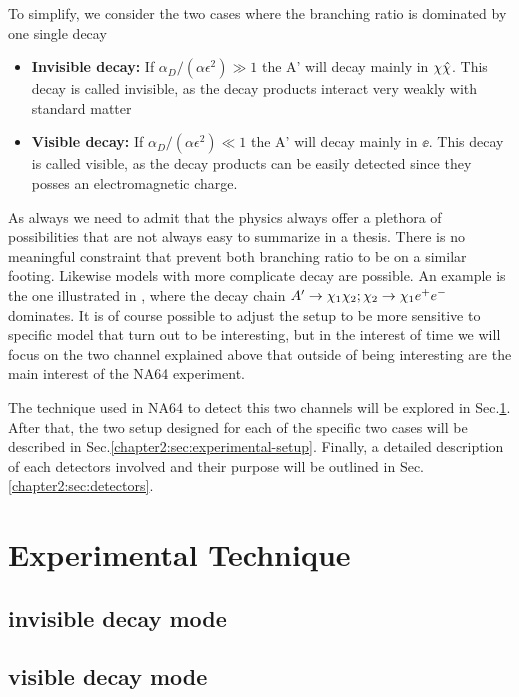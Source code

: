To simplify, we consider the two cases where the branching ratio is dominated by one single decay

\begin{itemize}
\item \textbf{Invisible decay:} If $\alpha_D / (\alpha \epsilon^2) \gg 1$ the A' will decay mainly in $\chi \hat{\chi}$. This decay is called invisible, as the decay products interact very weakly with standard matter
\item \textbf{Visible decay:} If $\alpha_D / (\alpha \epsilon^2) \ll 1$ the A' will decay mainly in $\ee$. This decay is called visible, as the decay products can be easily detected since they posses an electromagnetic charge. 
\end{itemize}

As always we need to admit that the physics always offer a plethora of possibilities that are not always easy to summarize in a thesis. There is no meaningful constraint that prevent both branching ratio to be on a similar footing. Likewise models with more complicate decay are possible. An example is the one illustrated in \cite{Mohlabeng_2019}, where the decay chain $A' \to \chi_1 \chi_2; \chi_2 \to \chi_1 e^+e^-$ dominates. It is of course possible to adjust the setup to be more sensitive to specific model that turn out to be interesting, but in the interest of time we will focus on the two channel explained above that outside of being interesting are the main interest of the NA64 experiment.

The technique used in NA64 to detect this two channels will be explored in Sec.\ref{chapter2:sec:experimental-technique}. After that, the two setup designed for each of the specific two cases will be described in Sec.\ref{chapter2:sec:experimental-setup}. Finally, a detailed description of each detectors involved and their purpose will be outlined in Sec.\ref{chapter2:sec:detectors}.


\section{Experimental Technique}
\label{chapter2:sec:experimental-technique}

\subsection{invisible decay mode}
\label{chapter2:sec:experimental-technique-invis}

\subsection{visible decay mode}
\label{chapter2:sec:experimental-technique-vis}

